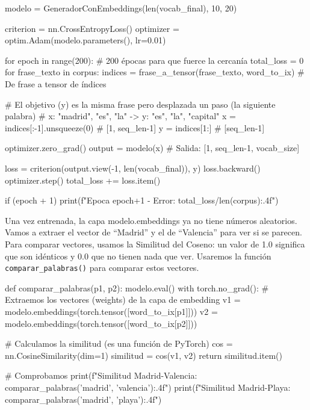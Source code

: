 \documentclass[a4paper,11pt]{article}
\begin{document}
\begin{codigo}
modelo = GeneradorConEmbeddings(len(vocab_final), 10, 20)

criterion = nn.CrossEntropyLoss()
optimizer = optim.Adam(modelo.parameters(), lr=0.01)

for epoch in range(200): # 200 épocas para que fuerce la cercanía
    total_loss = 0
    for frase_texto in corpus:
        indices = frase_a_tensor(frase_texto, word_to_ix)  # De frase a tensor de índices
        
        # El objetivo (y) es la misma frase pero desplazada un paso (la siguiente palabra)
        # x: "madrid", "es", "la" -> y: "es", "la", "capital"
        x = indices[:-1].unsqueeze(0) # [1, seq_len-1]
        y = indices[1:]              # [seq_len-1]
        
        optimizer.zero_grad()
        output = modelo(x) # Salida: [1, seq_len-1, vocab_size]
        
        loss = criterion(output.view(-1, len(vocab_final)), y)
        loss.backward()
        optimizer.step()
        total_loss += loss.item()
    
    if (epoch + 1) %
        print(f"Epoca {epoch+1} - Error: {total_loss/len(corpus):.4f}")
\end{codigo}

Una vez entrenada, la capa modelo.embeddings ya no tiene números
aleatorios. Vamos a extraer el vector de ``Madrid'' y el de ``Valencia''
para ver si se parecen. Para comparar vectores, usamos la Similitud del
Coseno: un valor de 1.0 significa que son idénticos y 0.0 que no tienen
nada que ver. Usaremos la función \texttt{comparar\_palabras()} para
comparar estos vectores.

\begin{codigo}
def comparar_palabras(p1, p2):
    modelo.eval()
    with torch.no_grad():
        # Extraemos los vectores (weights) de la capa de embedding
        v1 = modelo.embeddings(torch.tensor([word_to_ix[p1]]))
        v2 = modelo.embeddings(torch.tensor([word_to_ix[p2]]))
        
        # Calculamos la similitud (es una función de PyTorch)
        cos = nn.CosineSimilarity(dim=1)
        similitud = cos(v1, v2)
        return similitud.item()

# Comprobamos
print(f"Similitud Madrid-Valencia: {comparar_palabras('madrid', 'valencia'):.4f}")
print(f"Similitud Madrid-Playa: {comparar_palabras('madrid', 'playa'):.4f}")
\end{codigo}
\end{document}
